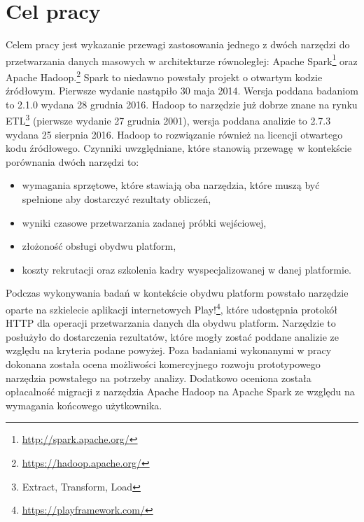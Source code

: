 \section{Cel pracy}
Celem pracy jest wykazanie przewagi zastosowania jednego z dwóch narzędzi do przetwarzania danych masowych w architekturze równoległej: Apache Spark\footnote{\url{http://spark.apache.org/}} oraz Apache Hadoop.\footnote{\url{https://hadoop.apache.org/}} Spark to niedawno powstały projekt o otwartym kodzie źródłowym. Pierwsze wydanie nastąpiło 30 maja 2014. Wersja poddana badaniom to 2.1.0 wydana 28 grudnia 2016. Hadoop to narzędzie już dobrze znane na rynku ETL\footnote{Extract, Transform, Load} (pierwsze wydanie 27 grudnia 2001), wersja poddana analizie to 2.7.3 wydana 25 sierpnia 2016. Hadoop to rozwiązanie również na licencji otwartego kodu źródłowego. Czynniki uwzględniane, które stanowią przewagę w kontekście porównania dwóch narzędzi to:
\begin{itemize}
	\item wymagania sprzętowe, które stawiają oba narzędzia, które muszą być spełnione aby dostarczyć rezultaty obliczeń,
	\item wyniki czasowe przetwarzania zadanej próbki wejściowej,
	\item złożoność obsługi obydwu platform,
	\item koszty rekrutacji oraz szkolenia kadry wyspecjalizowanej w danej platformie.
\end{itemize}
Podczas wykonywania badań w kontekście obydwu platform powstało narzędzie oparte na szkielecie aplikacji internetowych Play!\footnote{\url{https://playframework.com/}}, które udostępnia protokół HTTP dla operacji przetwarzania danych dla obydwu platform. Narzędzie to posłużyło do dostarczenia rezultatów, które mogły zostać poddane analizie ze względu na kryteria podane powyżej. Poza badaniami wykonanymi w pracy dokonana została ocena możliwości komercyjnego rozwoju prototypowego narzędzia powstałego na potrzeby analizy. Dodatkowo oceniona została opłacalność migracji z narzędzia Apache Hadoop na Apache Spark ze względu na wymagania końcowego użytkownika.
